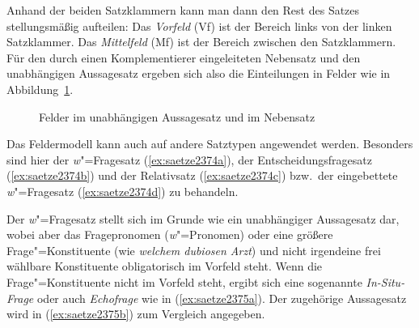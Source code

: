 Anhand der beiden Satzklammern kann man dann den Rest des Satzes stellungsmäßig aufteilen:
Das \textit{Vorfeld} (Vf) ist der Bereich links von der linken Satzklammer.
Das \textit{Mittelfeld} (Mf) ist der Bereich zwischen den Satzklammern.
Für den durch einen Komplementierer eingeleiteten Nebensatz und den unabhängigen Aussagesatz ergeben sich also die Einteilungen in Felder wie in Abbildung~\ref{fig:felder1}.

\begin{figure}[!htbp]
  \caption{Felder im unabhängigen Aussagesatz und im Nebensatz}
  \label{fig:felder1}
\end{figure}


\Enl

Das Feldermodell kann auch auf andere Satztypen angewendet werden.
Besonders sind hier der \textit{w}"=Fragesatz (\ref{ex:saetze2374a}), der Entscheidungsfragesatz (\ref{ex:saetze2374b}) und der Relativsatz (\ref{ex:saetze2374c}) bzw.\ der eingebettete \textit{w}"=Fragesatz (\ref{ex:saetze2374d}) zu behandeln.

\begin{exe}
  \ex\label{ex:saetze2374} 
  \begin{xlist}
  \end{xlist}
\end{exe}

\label{abs:923478} Der \textit{w}"=Fragesatz stellt sich im Grunde wie ein unabhängiger Aussagesatz dar, wobei aber das Fragepronomen (\textit{w}"=Pronomen) oder eine größere Frage"=Konstituente (wie \textit{welchem dubiosen Arzt}) und nicht irgendeine frei wählbare Konstituente obligatorisch im Vorfeld steht.
Wenn die Frage"=Konstituente nicht im Vorfeld steht, ergibt sich eine sogenannte \textit{In-Situ-Frage} oder auch \textit{Echofrage} wie in (\ref{ex:saetze2375a}).
Der zugehörige Aussagesatz wird in (\ref{ex:saetze2375b}) zum Vergleich angegeben.

